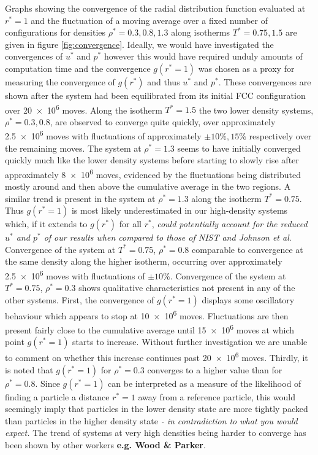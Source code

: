 \documentclass[10pt, twocolumn]{revtex4}    %
\begin{document}
Graphs showing the convergence of the radial distribution function evaluated at $r^{*}=1$ and the fluctuation of a moving average over a fixed number of configurations for densities $\rho{}^{*}=0.3, 0.8, 1.3$ along isotherms $T^{*} = 0.75, 1.5$ are given in figure \ref{fig:convergence}. Ideally, we would have investigated the convergences of $u^{*}$ and $p^{*}$ however this would have required unduly amounts of computation time and the convergence $g(r^{*}=1)$ was chosen as a proxy for measuring the convergence of $g(r^{*})$ and thus $u^{*}$ and $p^{*}$.
These convergences are shown after the system had been equilibrated from its initial FCC configuration over \num{20e6} moves.
Along the isotherm $T^{*}=1.5$ the two lower density systems, $\rho{}^{*}=0.3, 0.8$, are observed to converge quite quickly, over approximately \num{2.5e6} moves with fluctuations of approximately $\pm{}10\%, 15\%$ respectively over the remaining moves. The system at $\rho{}^{*}=1.3$ seems to have initially converged quickly much like the lower density systems before starting to slowly rise after approximately \num{8e6} moves, evidenced by the fluctuations being distributed mostly around and then above the cumulative average in the two regions.
A similar trend is present in the system at $\rho{}^{*}=1.3$ along the isotherm $T^{*}=0.75$. Thus $g(r^{*}=1)$ is most likely underestimated in our high-density systems which, if it extends to $g(r^{*})$ for all $r^{*}$, \textit{could potentially account for the reduced $u^{*}$ and $p^{*}$ of our results when compared to those of NIST and Johnson et al}.
Convergence of the system at $T^{*}=0.75$, $\rho{}^{*}=0.8$ comparable to convergence at the same density along the higher isotherm, occurring over approximately \num{2.5e6} moves with fluctuations of $\pm{}10\%$.
Convergence of the system at $T^{*}=0.75$, $\rho{}^{*}=0.3$ shows qualitative characteristics not present in any of the other systems. First, the convergence of $g(r^{*}=1)$ displays some oscillatory behaviour which appears to stop at \num{10e6} moves. Fluctuations are then present fairly close to the cumulative average until \num{15e6} moves at which point $g(r^{*}=1)$ starts to increase. Without further investigation we are unable to comment on whether this increase continues past \num{20e6} moves. Thirdly, it is noted that $g(r^{*}=1)$ for $\rho{}^{*}=0.3$ converges to a higher value than for $\rho{}^{*}=0.8$. Since $g(r^{*}=1)$ can be interpreted as a measure of the likelihood of finding a particle a distance $r^{*}=1$ away from a reference particle, this would seemingly imply that particles in the lower density state are more tightly packed than particles in the higher density state \textit{- in contradiction to what you would expect.}
The trend of systems at very high densities being harder to converge has been shown by other workers \textbf{e.g. Wood \& Parker}.
\end{document}
